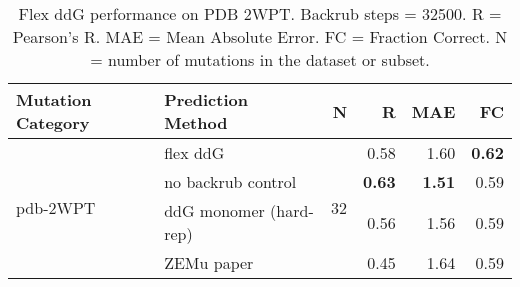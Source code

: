 \begin{table}
  \begin{tabular}{llrrrr}
\toprule
Mutation Category &       Prediction Method &   N &    R &  MAE &   FC \\
\midrule
 \multirow{ 4}{*}{pdb-2WPT} & flex ddG & \multirow{ 4}{*}{32} & 0.58 & 1.60 & \textbf{0.62}  \\
 & no backrub control & & \textbf{0.63} & \textbf{1.51} & 0.59  \\
 & ddG monomer (hard-rep) & & 0.56 & 1.56 & 0.59  \\
 & ZEMu paper & & 0.45 & 1.64 & 0.59  \\
\bottomrule
\end{tabular}
  \caption[Flex ddG performance on PDB 2WPT]{
    Flex ddG performance on PDB 2WPT. Backrub steps = 32500. R = Pearson's R. MAE = Mean Absolute Error. FC = Fraction Correct. N = number of mutations in the dataset or subset.
  } \label{tab:table-pdb-2WPT}
\end{table}

